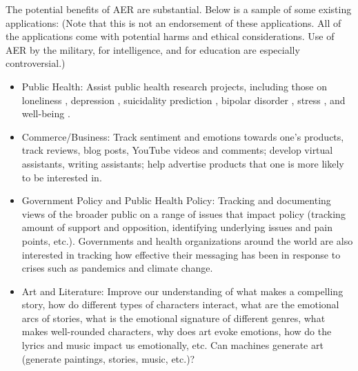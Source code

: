 \documentclass{clv3}
\begin{document}
The potential benefits of AER are substantial.
Below is a sample of some existing applications: (Note that this is not an endorsement of these applications. All of the applications come with potential harms and ethical considerations. Use of AER by the military, for intelligence, and for education are especially controversial.)\\[-20pt]
\begin{itemize}
\item Public Health: Assist public health research projects, including those on loneliness \cite{guntuku2019studying,kiritchenko-etal-2020-solo}, depression \cite{de2013predicting,resnik-etal-2015-beyond}, suicidality prediction \cite{macavaney-etal-2021-community}, bipolar disorder \cite{karam2014ecologically}, stress \cite{eichstaedt2015psychological}, and well-being \cite{schwartz2013characterizing}. 
   \vspace*{-1mm} 
\item Commerce/Business: Track sentiment and emotions towards one’s products, track reviews, blog posts, YouTube videos and comments; develop virtual assistants, writing assistants; help advertise products that one is more likely to be interested in.
   \vspace*{-1mm} 
\item Government Policy and Public Health Policy: Tracking and documenting views of the broader public on a range of issues that impact policy (tracking amount of support and opposition, identifying underlying issues and pain points, etc.). Governments and health organizations around the world are also interested in tracking how effective their messaging has been in response to crises such as pandemics and climate change.
   \vspace*{-1mm} 
\item Art and Literature: Improve our understanding of what makes a compelling story, how do different types of characters interact, what are the emotional arcs of stories,
what is the emotional signature of different genres, 
what makes well-rounded characters, 
why does art evoke emotions, 
how do the lyrics and music impact us emotionally, etc. Can machines generate art  (generate paintings, stories, music, etc.)?

\end{itemize}
\end{document}
